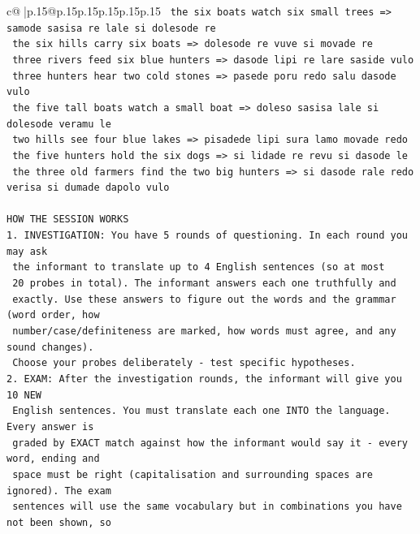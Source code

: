 \documentclass{article}
\begin{document}
{\begin{supertabular}{c@{$\;$}|p{.15\linewidth}@{}p{.15\linewidth}p{.15\linewidth}p{.15\linewidth}p{.15\linewidth}p{.15\linewidth}}
{{{\texttt{    the six boats watch six small trees  =>  samode sasisa re lale si dolesode re} \\
\texttt{    the six hills carry six boats  =>  dolesode re vuve si movade re} \\
\texttt{    three rivers feed six blue hunters  =>  dasode lipi re lare saside vulo} \\
\texttt{    three hunters hear two cold stones  =>  pasede poru redo salu dasode vulo} \\
\texttt{    the five tall boats watch a small boat  =>  doleso sasisa lale si dolesode veramu le} \\
\texttt{    two hills see four blue lakes  =>  pisadede lipi sura lamo movade redo} \\
\texttt{    the five hunters hold the six dogs  =>  si lidade re revu si dasode le} \\
\texttt{    the three old farmers find the two big hunters  =>  si dasode rale redo verisa si dumade dapolo vulo} \\
\\ 
\texttt{HOW THE SESSION WORKS} \\
\texttt{1. INVESTIGATION: You have 5 rounds of questioning. In each round you may ask} \\
\texttt{   the informant to translate up to 4 English sentences (so at most} \\
\texttt{   20 probes in total). The informant answers each one truthfully and} \\
\texttt{   exactly. Use these answers to figure out the words and the grammar (word order, how} \\
\texttt{   number/case/definiteness are marked, how words must agree, and any sound changes).} \\
\texttt{   Choose your probes deliberately {-} test specific hypotheses.} \\
\texttt{2. EXAM: After the investigation rounds, the informant will give you 10 NEW} \\
\texttt{   English sentences. You must translate each one INTO the language. Every answer is} \\
\texttt{   graded by EXACT match against how the informant would say it {-} every word, ending and} \\
\texttt{   space must be right (capitalisation and surrounding spaces are ignored). The exam} \\
\texttt{   sentences will use the same vocabulary but in combinations you have not been shown, so} \\
}}}
\end{supertabular}}
\end{document}
